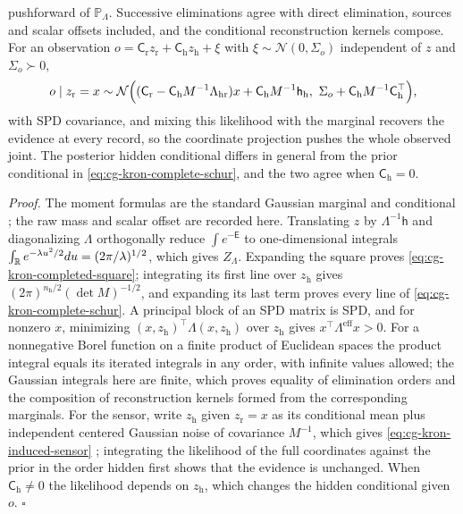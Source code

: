 pushforward of \(\mathbb P_\Lambda\). Successive eliminations agree with direct
elimination, sources and scalar offsets included, and the conditional
reconstruction kernels compose. For an observation
\(o=\mathsf C_{\mathrm r}z_{\mathrm r}+\mathsf C_{\mathrm h}z_{\mathrm h}+\xi\) with
\(\xi\sim\mathcal N(0,\Sigma_o)\) independent of \(z\) and \(\Sigma_o\succ0\),
\begin{equation}
o\mid z_{\mathrm r}=x\sim
\mathcal N\Bigl(
(\mathsf C_{\mathrm r}-\mathsf C_{\mathrm h}M^{-1}\Lambda_{\mathrm{hr}})x
+\mathsf C_{\mathrm h}M^{-1}\mathsf h_{\mathrm h},\
\Sigma_o+\mathsf C_{\mathrm h}M^{-1}\mathsf C_{\mathrm h}^\top
\Bigr),
\label{eq:cg-kron-induced-sensor}
\end{equation}
with SPD covariance, and mixing this likelihood with the marginal recovers the
evidence at every record, so the coordinate projection pushes the whole
observed joint. The posterior hidden conditional differs in general from the
prior conditional in \eqref{eq:cg-kron-complete-schur}, and the two agree when
\(\mathsf C_{\mathrm h}=0\). \status{ESTABLISHED}

\noindent\emph{Proof.}
The moment formulas are the standard Gaussian marginal and conditional
\citep[Secs.~2.3.1--2.3.2, Eqs.~(2.73), (2.75), (2.91)--(2.93)]{Bishop2006};
the raw mass and scalar offset are recorded here. Translating \(z\) by
\(\Lambda^{-1}\mathsf h\) and diagonalizing \(\Lambda\) orthogonally reduce
\(\int e^{-\mathsf E}\) to one-dimensional integrals
\(\int_\mathbb R e^{-\lambda u^2/2}du=(2\pi/\lambda)^{1/2}\), which gives \(Z_\Lambda\).
Expanding the square proves \eqref{eq:cg-kron-completed-square}; integrating
its first line over \(z_{\mathrm h}\) gives
\((2\pi)^{n_{\mathrm h}/2}(\det M)^{-1/2}\), and expanding its last term proves
every line of \eqref{eq:cg-kron-complete-schur}. A principal block of an SPD
matrix is SPD, and for nonzero \(x\), minimizing
\((x,z_{\mathrm h})^\top\Lambda(x,z_{\mathrm h})\) over \(z_{\mathrm h}\) gives
\(x^\top\Lambda^{\mathrm{eff}}x>0\). For a nonnegative Borel function on a
finite product of Euclidean spaces the product integral equals its iterated
integrals in any order, with infinite values allowed; the Gaussian integrals
here are finite, which proves equality of elimination orders and the
composition of reconstruction kernels formed from the corresponding marginals.
For the sensor, write \(z_{\mathrm h}\) given \(z_{\mathrm r}=x\) as its
conditional mean plus independent centered Gaussian noise of covariance
\(M^{-1}\), which gives \eqref{eq:cg-kron-induced-sensor}
\citep[Sec.~2.3.3, Eq.~(2.115)]{Bishop2006}; integrating the likelihood of the
full coordinates against the prior in the order hidden first shows that the
evidence is unchanged. When \(\mathsf C_{\mathrm h}\neq0\) the likelihood depends
on \(z_{\mathrm h}\), which changes the hidden conditional given \(o\).
\(\square\)

